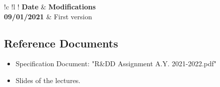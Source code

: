 \setlength\arrayrulewidth{1pt}
\setlength\LTleft{0pt}
\begin{longtable}{ !\Vline c !\Vline l !\Vline}
    \hline
    \textbf{Date}   & \textbf{Modifications}\\
    \textbf{09/01/2021}     & First version\\
    \hline
\end{longtable}


\subsection{Reference Documents}

\begin{itemize}
    \item Specification Document: "R\&DD Assignment A.Y. 2021-2022.pdf"
    \item Slides of the lectures.
\end{itemize}


